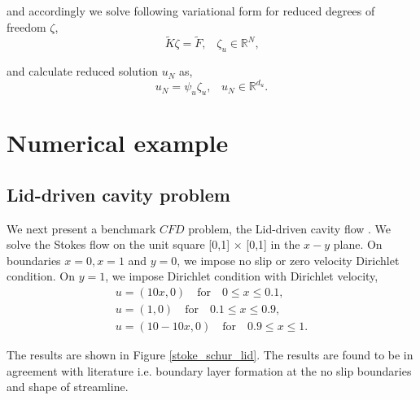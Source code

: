 \documentclass[a4paper,oneside,openright,spanish,english]{book}
\begin{document}
and accordingly we solve following variational form for reduced degrees of freedom $\zeta$,
\begin{equation}
\tilde{K} \zeta = \tilde{F} \textrm{,} \quad \zeta_u \in \mathbb{R}^{N} \textrm{,}
\end{equation}

and calculate reduced solution $u_N$ as,
\begin{equation}
u_N = \psi_u \zeta_u \textrm{,} \quad u_N \in \mathbb{R}^{d_u} \textrm{.}
\end{equation}

\chapter{Numerical example}

\section{Lid-driven cavity problem} \label{lid_driven_cavity_stokes}

We next present a benchmark $CFD$ problem, the Lid-driven cavity flow \cite{Montlaur2}. We solve the Stokes flow on the unit square [0,1] $\times$ [0,1] in the $x-y$ plane. On boundaries ${x = 0}, {x = 1}$ and ${y = 0}$, we impose no slip or zero velocity Dirichlet condition. On ${y = 1}$, we impose Dirichlet condition with Dirichlet velocity,
\begin{equation}
\begin{split}
u = (10x,0) \quad \textrm{for} \quad 0 \leq x \leq 0.1 \textrm{,}\\
u = (1,0) \quad \textrm{for} \quad 0.1 \leq x \leq 0.9 \textrm{,}\\
u = (10 - 10x,0) \quad \textrm{for} \quad 0.9 \leq x \leq 1 \textrm{.}
\end{split}
\end{equation}

The results are shown in Figure \ref{stoke_schur_lid}. The results are found to be in agreement with literature i.e. boundary layer formation at the no slip boundaries and shape of streamline. 
\end{document}
